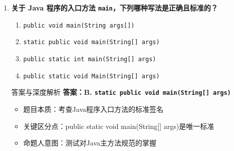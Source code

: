 \documentclass[12pt, a4paper]{ctexart}
\begin{document}
\begin{enumerate}[label=\textbf{\arabic*.}]
\begin{bluebox}{答案与深度解析}
\begin{enumerate}
			      \item Java不支持：
			            \begin{itemize}
				            \item 指针运算
				            \item 手动内存管理
				            \item  unchecked异常可选择性处理
			            \end{itemize}
		      \end{enumerate}

		      \begin{itemize}
			      \item 记忆口诀：Java健壮靠自动，指针危险必须抛
			      \item 考试看到"支持指针" → 直接排除
		      \end{itemize}
	      \end{bluebox}

	      \newpage

	\item \textbf{关于 Java 程序的入口方法 \texttt{main}，下列哪种写法是正确且标准的？}
	      \begin{enumerate}[label=\Alph*.]
		      \item \texttt{public void main(String args[])}
		      \item \texttt{static public void main(String[] args)}
		      \item \texttt{public static int main(String[] args)}
		      \item \texttt{public static void Main(String[] args)}
	      \end{enumerate}

	      \begin{bluebox}{答案与深度解析}
		      \textbf{答案：B. \texttt{static public void main(String[] args)}}

		      \begin{itemize}[leftmargin=*, nosep]
			      \item 题目本质：考查Java程序入口方法的标准签名
			      \item 关键区分点：public static void main(String[] args)是唯一标准
			      \item 命题人意图：测试对Java主方法规范的掌握
		      \end{itemize}



\end{bluebox}
\end{enumerate}
\end{document}
